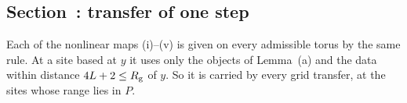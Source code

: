 \subsection{Section~\texorpdfstring{}{59}: transfer of one step}\label{d11b:59b}

\begin{detail}\label{d11b:gl-inventory}
Each of the nonlinear maps (i)--(v) is given on every admissible torus by the same rule. At a site based at $y$ it uses only the objects of Lemma~(a) and the data within distance $4L+2\le R_{\rm g}$ of $y$. So it is carried by every grid transfer, at the sites whose range lies in $P$.
\end{detail}

